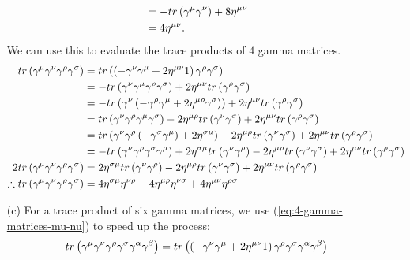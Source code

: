 \begin{enumerate}
\begin{align}
        &=-tr\left(\gamma^\mu\gamma^\nu\right)+8\eta^{\mu\nu}\notag\\
        &=4\eta^{\mu\nu}.
    \end{align}
    We can use this to evaluate the trace products of $4$ gamma matrices.
    \begin{align}
        tr\left(\gamma^\mu\gamma^\nu\gamma^\rho\gamma^\sigma\right)&=tr\left(\left(-\gamma^\nu\gamma^\mu+2\eta^{\mu\nu}1\right)\gamma^\rho\gamma^\sigma\right)\notag\\
        &=-tr\left(\gamma^\nu\gamma^\mu\gamma^\rho\gamma^\sigma\right)+2\eta^{\mu\nu}tr\left(\gamma^\rho\gamma^\sigma\right)\notag\\
        &=-tr\left(\gamma^\nu\left(-\gamma^\rho\gamma^\mu+2\eta^{\mu\rho}\gamma^\sigma\right)\right)+2\eta^{\mu\nu}tr\left(\gamma^\rho\gamma^\sigma\right)\notag\\
        &=tr\left(\gamma^\nu\gamma^\rho\gamma^\mu\gamma^\sigma\right)-2\eta^{\mu\rho}tr\left(\gamma^\nu\gamma^\sigma\right)+2\eta^{\mu\nu}tr\left(\gamma^\rho\gamma^\sigma\right)\notag\\
        &=tr\left(\gamma^\nu\gamma^\rho\left(-\gamma^\sigma\gamma^\mu\right)+2\eta^{\sigma\mu}\right)-2\eta^{\mu\rho}tr\left(\gamma^\nu\gamma^\sigma\right)+2\eta^{\mu\nu}tr\left(\gamma^\rho\gamma^\sigma\right)\notag\\
        &=-tr\left(\gamma^\nu\gamma^\rho\gamma^\sigma\gamma^\mu\right)+2\eta^{\sigma\mu}tr\left(\gamma^\nu\gamma^\rho\right)-2\eta^{\mu\rho}tr\left(\gamma^\nu\gamma^\sigma\right)+2\eta^{\mu\nu}tr\left(\gamma^\rho\gamma^\sigma\right)\notag\\
        2tr\left(\gamma^\mu\gamma^\nu\gamma^\rho\gamma^\sigma\right)&=2\eta^{\sigma\mu}tr\left(\gamma^\nu\gamma^\rho\right)-2\eta^{\mu\rho}tr\left(\gamma^\nu\gamma^\sigma\right)+2\eta^{\mu\nu}tr\left(\gamma^\rho\gamma^\sigma\right)\notag\\
        \therefore tr\left(\gamma^\mu\gamma^\nu\gamma^\rho\gamma^\sigma\right)&=4\eta^{\sigma\mu}\eta^{\nu\rho}-4\eta^{\mu\rho}\eta^{\nu\sigma}+4\eta^{\mu\nu}\eta^{\rho\sigma}\label{eq:4-gamma-matrices-mu-nu}
    \end{align}
    \item [(c)] For a trace product of six gamma matrices, we use (\ref{eq:4-gamma-matrices-mu-nu}) to speed up the process:
    \begin{align}
        tr\left(\gamma^\mu\gamma^\nu\gamma^\rho\gamma^\sigma\gamma^\alpha\gamma^\beta\right)&=tr\left(\left(-\gamma^\nu\gamma^\mu+2\eta^{\mu\nu}1\right)\gamma^\rho\gamma^\sigma\gamma^\alpha\gamma^\beta\right)\notag\\

\end{align}
\end{enumerate}
